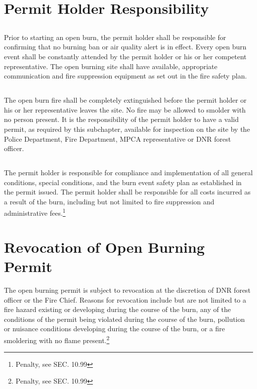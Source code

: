 \section{Permit Holder Responsibility}
\subsection{}
Prior to starting an open burn, the permit holder shall be responsible for confirming that no burning ban or air quality alert is in effect.  Every open burn event shall be constantly attended by the permit holder or his or her competent representative.  The open burning site shall have available, appropriate communication and fire suppression equipment as set out in the fire safety plan.
\subsection{}
The open burn fire shall be completely extinguished before the permit holder or his or her representative leaves the site.  No fire may be allowed to smolder with no person present.  It is the responsibility of the permit holder to have a valid permit, as required by this subchapter, available for inspection on the site by the Police Department, Fire Department, MPCA representative or DNR forest officer.
\subsection{}
The permit holder is responsible for compliance and implementation of all general conditions, special conditions, and the burn event safety plan as established in the permit issued.  The permit holder shall be responsible for all costs incurred as a result of the burn, including but not limited to fire suppression and administrative fees.\footnote{Penalty, see SEC. 10.99}

\section{Revocation of Open Burning Permit}
The open burning permit is subject to revocation at the discretion of DNR forest officer or the Fire Chief.  Reasons for revocation include but are not limited to a fire hazard existing or developing during the course of the burn, any of the conditions of the permit being violated during the course of the burn, pollution or nuisance conditions developing during the course of the burn, or a fire smoldering with no flame present.\footnote{Penalty, see SEC. 10.99}

